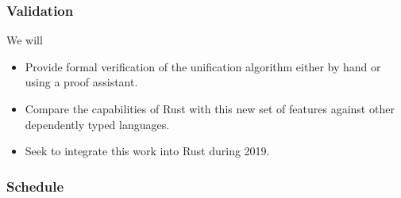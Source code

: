 \documentclass{beamer}
\begin{document}
\begin{frame}[fragile]
    \frametitle{Validation}
    We will
    \begin{itemize}
        \item Provide formal verification of the unification algorithm either by hand or using a proof assistant.
        \item Compare the capabilities of Rust with this new set of features against other dependently typed languages.
        \item Seek to integrate this work into Rust during 2019.
    \end{itemize}
\end{frame}

\begin{frame}[fragile]
    \frametitle{Schedule}
\end{frame}
\end{document}
